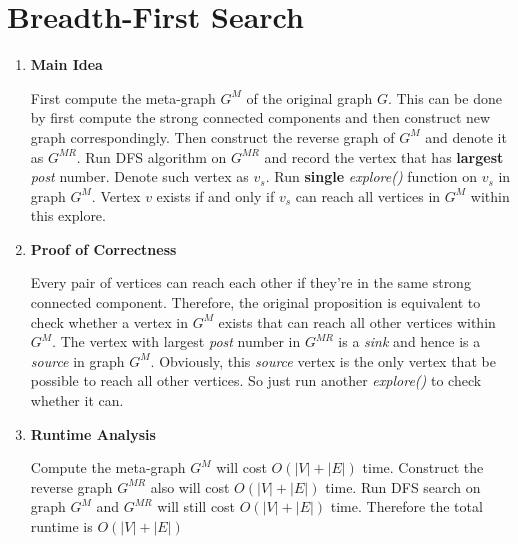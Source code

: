 \documentclass[11pt]{article}
\newenvironment{qparts}{\begin{enumerate}[{(}a{)}]}{\end{enumerate}}
\begin{document}
\newpage
\section{Breadth-First Search}

\begin{qparts}

	\item \textbf{Main Idea}
	
	First compute the meta-graph $G^M$ of the original graph $G$. This can be done by first compute the strong connected components and then construct new graph correspondingly. Then construct the reverse graph of $G^M$ and denote it as $G^{MR}$. Run DFS algorithm on $G^{MR}$ and record the vertex that has \textbf{largest} \textit{post} number. Denote such vertex as $v_s$. Run \textbf{single} \textit{explore()} function on $v_s$ in graph $G^M$. Vertex $v$ exists if and only if $v_s$ can reach all vertices in $G^{M}$ within this explore.
	
	\item \textbf{Proof of Correctness}
	
	Every pair of vertices can reach each other if they're in the same strong connected component. Therefore, the original proposition is equivalent to check whether a vertex in $G^M$ exists that can reach all other vertices within $G^M$. The vertex with largest \textit{post} number in $G^{MR}$ is a \textit{sink} and hence is a \textit{source} in graph $G^M$. Obviously, this \textit{source} vertex is the only vertex that be possible to reach all other vertices. So just run another \textit{explore()} to check whether it can.
			
	\item \textbf{Runtime Analysis}
	
	Compute the meta-graph $G^M$ will cost $O(|V| + |E|)$ time. Construct the reverse graph $G^{MR}$ also will cost $O(|V| + |E|)$ time. Run DFS search on graph $G^M$ and $G^{MR}$ will still cost $O(|V| + |E|)$ time. Therefore the total runtime is $O(|V|+|E|)$

\end{qparts}
\end{document}
